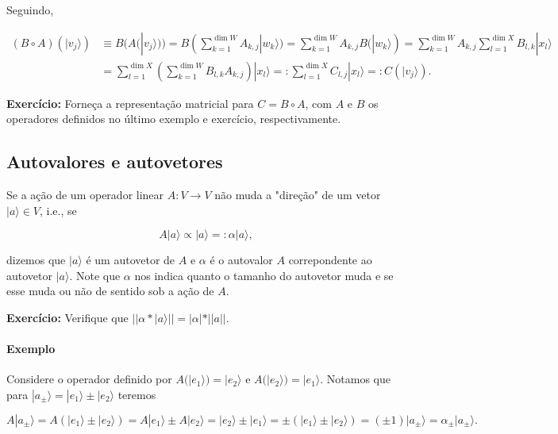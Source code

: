 \documentclass[11pt]{article}
\begin{document}
Seguindo,

\begin{align}
(B\circ A)(|v_{j}\rangle) & \equiv B(A(|v_{j}\rangle)) = B(\sum_{k=1}^{\dim W} A_{k,j}|w_{k}\rangle) = \sum_{k=1}^{\dim W} A_{k,j}B(|w_{k}\rangle) = \sum_{k=1}^{\dim W} A_{k,j}\sum_{l=1}^{\dim X}B_{l,k}|x_{l}\rangle \\
& = \sum_{l=1}^{\dim X}\left(\sum_{k=1}^{\dim W} B_{l,k}A_{k,j}\right)|x_{l}\rangle =: \sum_{l=1}^{\dim X}C_{l,j}|x_{l}\rangle =: C(|v_{j}\rangle).
\end{align}

\textbf{Exercício:} Forneça a representação matricial para
\(C=B\circ A\), com \(A\) e \(B\) os operadores definidos no último
exemplo e exercício, respectivamente.

    \subsection{Autovalores e autovetores}\label{autovalores-e-autovetores}

Se a ação de um operador linear \(A:V\rightarrow V\) não muda a
"direção" de um vetor \(|a\rangle\in V\), i.e., se

\begin{equation}
A|a\rangle\propto |a\rangle =: \alpha|a\rangle,
\end{equation}

dizemos que \(|a\rangle\) é um autovetor de \(A\) e \(\alpha\) é o
autovalor \(A\) correpondente ao autovetor \(|a\rangle\). Note que
\(\alpha\) nos indica quanto o tamanho do autovetor muda e se esse muda
ou não de sentido sob a ação de \(A\).

\textbf{Exercício:} Verifique que
\(||\alpha*|a\rangle||=|\alpha|*||a||\).

\paragraph{Exemplo}\label{exemplo}

Considere o operador definido por
\(A(|e_{1}\rangle)=|e_{2}\rangle \text{ e } A(|e_{2}\rangle)=|e_{1}\rangle\).
Notamos que para \(|a_{\pm}\rangle=|e_{1}\rangle\pm|e_{2}\rangle\)
teremos

\begin{equation}
A|a_{\pm}\rangle = A(|e_{1}\rangle\pm|e_{2}\rangle) = A|e_{1}\rangle\pm A|e_{2}\rangle = |e_{2}\rangle\pm |e_{1}\rangle = \pm(|e_{1}\rangle \pm |e_{2}\rangle) = (\pm1)|a_{\pm}\rangle = \alpha_{\pm}|a_{\pm}\rangle.
\end{equation}
\end{document}
